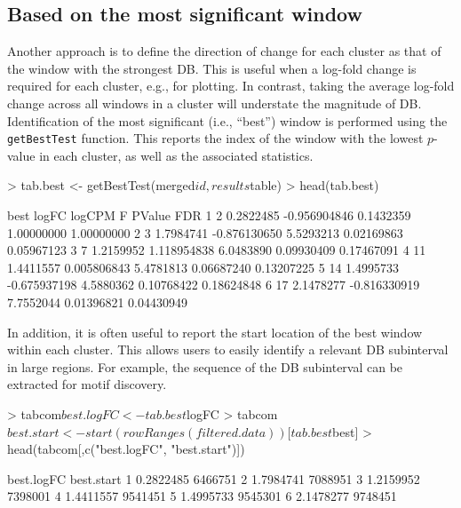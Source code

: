 \documentclass[12pt]{report}
\renewenvironment{Schunk}{\vspace{0pt}}{\vspace{0pt}}
\newcommand{\code}[1]{{\small\texttt{#1}}}
\begin{document}
\subsection{Based on the most significant window}
Another approach is to define the direction of change for each cluster as that of the window with the strongest DB.
This is useful when a log-fold change is required for each cluster, e.g., for plotting.
In contrast, taking the average log-fold change across all windows in a cluster will understate the magnitude of DB.
Identification of the most significant (i.e., ``best'') window is performed using the \code{getBestTest} function.
This reports the index of the window with the lowest $p$-value in each cluster, as well as the associated statistics.

\begin{Schunk}
\begin{Sinput}
> tab.best <- getBestTest(merged$id, results$table)
> head(tab.best)
\end{Sinput}
\begin{Soutput}
  best     logFC       logCPM         F     PValue        FDR
1    2 0.2822485 -0.956904846 0.1432359 1.00000000 1.00000000
2    3 1.7984741 -0.876130650 5.5293213 0.02169863 0.05967123
3    7 1.2159952  1.118954838 6.0483890 0.09930409 0.17467091
4   11 1.4411557  0.005806843 5.4781813 0.06687240 0.13207225
5   14 1.4995733 -0.675937198 4.5880362 0.10768422 0.18624848
6   17 2.1478277 -0.816330919 7.7552044 0.01396821 0.04430949
\end{Soutput}
\end{Schunk}

In addition, it is often useful to report the start location of the best window within each cluster.
This allows users to easily identify a relevant DB subinterval in large regions.
For example, the sequence of the DB subinterval can be extracted for motif discovery.

\begin{Schunk}
\begin{Sinput}
> tabcom$best.logFC <- tab.best$logFC
> tabcom$best.start <- start(rowRanges(filtered.data))[tab.best$best]
> head(tabcom[,c("best.logFC", "best.start")])
\end{Sinput}
\begin{Soutput}
  best.logFC best.start
1  0.2822485    6466751
2  1.7984741    7088951
3  1.2159952    7398001
4  1.4411557    9541451
5  1.4995733    9545301
6  2.1478277    9748451
\end{Soutput}
\end{Schunk}
\end{document}
